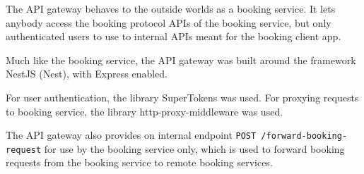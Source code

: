 The API gateway behaves to the outside worlds as a booking service. It lets anybody access the booking protocol APIs of the booking service, but only authenticated users to use to internal APIs meant for the booking client app.

Much like the booking service, the API gateway was built around the framework NestJS (Nest), with Express enabled.

For user authentication, the library SuperTokens was used. For proxying requests to booking service, the library http-proxy-middleware was used.

The API gateway also provides on internal endpoint \texttt{POST /forward-booking-request} for use by the booking service only, which is used to forward booking requests from the booking service to remote booking services.
